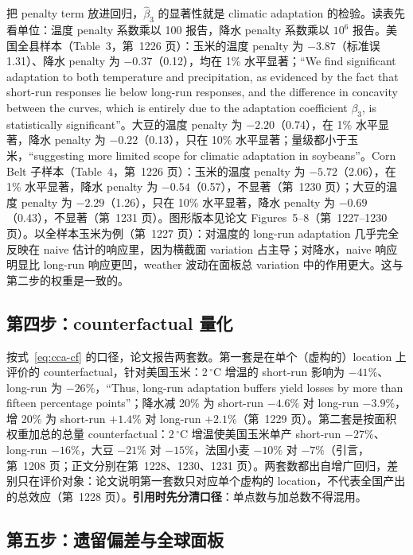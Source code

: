 把 penalty term 放进回归，$\widehat{\beta}_3$ 的显著性就是 climatic adaptation 的检验。读表先看单位：温度 penalty 系数乘以 100 报告，降水 penalty 系数乘以 $10^6$ 报告。美国全县样本（Table~3，第~1226 页）：玉米的温度 penalty 为 $-3.87$（标准误 1.31）、降水 penalty 为 $-0.37$（0.12），均在 1\% 水平显著；``We find significant adaptation to both temperature and precipitation, as evidenced by the fact that short-run responses lie below long-run responses, and the difference in concavity between the curves, which is entirely due to the adaptation coefficient $\beta_3$, is statistically significant''\citep[第~1226--1227 页]{merel2021climate}。大豆的温度 penalty 为 $-2.20$（0.74），在 1\% 水平显著，降水 penalty 为 $-0.22$（0.13），只在 10\% 水平显著；量级都小于玉米，``suggesting more limited scope for climatic adaptation in soybeans''\citep[第~1230 页]{merel2021climate}。Corn Belt 子样本（Table~4，第~1226 页）：玉米的温度 penalty 为 $-5.72$（2.06），在 1\% 水平显著，降水 penalty 为 $-0.54$（0.57），不显著（第~1230 页）；大豆的温度 penalty 为 $-2.29$（1.26），只在 10\% 水平显著，降水 penalty 为 $-0.69$（0.43），不显著（第~1231 页）。图形版本见论文 Figures~5--8（第~1227--1230 页）。以全样本玉米为例（第~1227 页）：对温度的 long-run adaptation 几乎完全反映在 naive 估计的响应里，因为横截面 variation 占主导；对降水，naive 响应明显比 long-run 响应更凹，weather 波动在面板总 variation 中的作用更大。这与第二步的权重是一致的。

\subsection{第四步：counterfactual 量化}

按式~\ref{eq:cca-cf} 的口径，论文报告两套数。第一套是在单个（虚构的）location 上评价的 counterfactual，针对美国玉米：2\,$^\circ$C 增温的 short-run 影响为 $-41\%$、long-run 为 $-26\%$，``Thus, long-run adaptation buffers yield losses by more than fifteen percentage points''\citep[第~1228 页]{merel2021climate}；降水减 20\% 为 short-run $-4.6\%$ 对 long-run $-3.9\%$，增 20\% 为 short-run $+1.4\%$ 对 long-run $+2.1\%$（第~1229 页）。第二套是按面积权重加总的总量 counterfactual：2\,$^\circ$C 增温使美国玉米单产 short-run $-27\%$、long-run $-16\%$，大豆 $-21\%$ 对 $-15\%$，法国小麦 $-10\%$ 对 $-7\%$（引言，第~1208 页；正文分别在第~1228、1230、1231 页）。两套数都出自增广回归，差别只在评价对象：论文说明第一套数只对应单个虚构的 location，不代表全国产出的总效应（第~1228 页）。\textbf{引用时先分清口径}：单点数与加总数不得混用。

\subsection{第五步：遗留偏差与全球面板}

